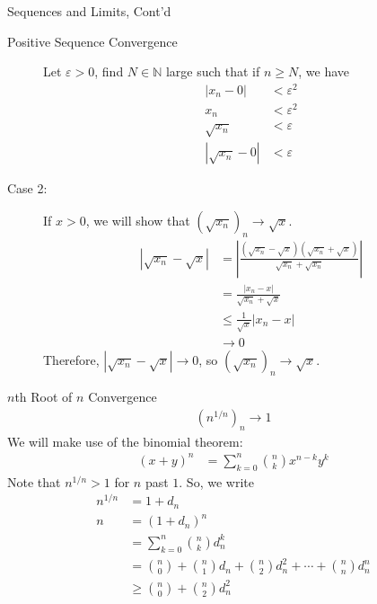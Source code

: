 \documentclass[8pt]{extarticle}
\newcommand{\N}{\mathbb{N}}
\begin{document}
\begin{problem}{Sequences and Limits, Cont'd}
\begin{problem}{Positive Sequence Convergence}
\begin{description}
          Let $\varepsilon > 0$, find $N\in\N$ large such that if $n\geq N$, we have
          \begin{align*}
            |x_n - 0| &< \varepsilon^2\\
            x_n &< \varepsilon^2\\
            \sqrt{x_n} &< \varepsilon\\
            |\sqrt{x_n} - 0| &< \varepsilon
          \end{align*}
        \item[Case 2:] If $x > 0$, we will show that $\left(\sqrt{x_n}\right)_n \rightarrow \sqrt{x}$.
          \begin{align*}
            \left|\sqrt{x_n} - \sqrt{x}\right| &= \left|\frac{\left(\sqrt{x_n} - \sqrt{x}\right)\left(\sqrt{x_n} + \sqrt{x}\right)}{\sqrt{x_n} + \sqrt{x_n}}\right|\\
                                               &= \frac{|x_n-x|}{\sqrt{x_n} + \sqrt{x}}\\
                                               &\leq \frac{1}{\sqrt{x}} |x_n - x|\\
                                               &\rightarrow 0
          \end{align*}
          Therefore, $|\sqrt{x_n}-\sqrt{x}| \rightarrow 0$, so $\left(\sqrt{x_n}\right)_n \rightarrow \sqrt{x}$.
      \end{description}
    \end{problem}
    \begin{problem}{$n$th Root of $n$ Convergence}
      \begin{align*}
        \left(n^{1/n}\right)_n \rightarrow 1
      \end{align*}
      \tcblower
      We will make use of the binomial theorem:
      \begin{align*}
        (x+y)^n &= \sum_{k=0}^{n} {n\choose k}x^{n-k}y^{k}
      \end{align*}
      Note that $n^{1/n} > 1$ for $n$ past $1$. So, we write
      \begin{align*}
        n^{1/n} &= 1 + d_n \tag*{$d_n > 0$}\\
        n &= (1+d_n)^{n}\\
          &= \sum_{k=0}^{n} {n\choose k}d_n^{k}\\
          &= {n\choose 0} + {n\choose 1}d_n + {n\choose 2}d_n^2 + \cdots + {n\choose n}d_n^n\\
          &\geq {n\choose 0} + {n\choose 2}d_n^2 \tag*{as all terms are positive}\\

\end{align*}
\end{problem}
\end{problem}
\end{document}
